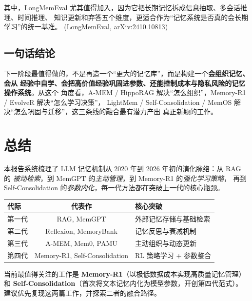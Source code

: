 \documentclass[11pt,a4paper]{article}
\begin{document}
其中，LongMemEval 尤其值得加入，因为它把长期记忆拆成信息抽取、多会话推理、时间推理、
知识更新和弃答五个维度，更适合作为“记忆系统是否真的会长期学习”的统一基准。
\hfill(\href{https://arxiv.org/abs/2410.10813}{LongMemEval, arXiv:2410.10813})

\subsection{一句话结论}

下一阶段最值得做的，不是再造一个“更大的记忆库”，而是构建一个\textbf{会组织记忆、会从
经验中自学、会把高价值经验巩固进参数、还能控制成本与隐私风险的记忆操作系统}。从这个
角度看，A-MEM / HippoRAG 解决“怎么组织”，Memory-R1 / EvolveR 解决“怎么学习决策”，
LightMem / Self-Consolidation / MemOS 解决“怎么巩固与迁移”，这三条线的融合最有潜力产出
真正新颖的工作。


\section{总结}

本报告系统梳理了 LLM 记忆机制从 2020 年到 2026 年初的演化脉络：从 RAG 的
\emph{被动检索}，到 MemGPT 的\emph{主动管理}，到 Memory-R1 的\emph{强化学习策略}，
再到 Self-Consolidation 的\emph{参数内化}，每一代方法都在突破上一代的核心瓶颈。

\begin{center}
\begin{tabular}{lcl}
\toprule
\textbf{代际} & \textbf{代表作} & \textbf{核心突破} \\
\midrule
第一代 & RAG, MemGPT & 外部记忆存储与基础检索 \\
第二代 & Reflexion, MemoryBank & 记忆反思与衰减机制 \\
第三代 & A-MEM, Mem0, PAMU & 主动组织与动态更新 \\
第四代 & Memory-R1, Self-Consolidation & RL 策略学习 + 参数整合 \\
\bottomrule
\end{tabular}
\end{center}

\vspace{1em}
当前最值得关注的工作是 \textbf{Memory-R1}（以极低数据成本实现高质量记忆管理）和
\textbf{Self-Consolidation}（首次将文本记忆内化为模型参数，开创第四代范式）。
建议优先复现这两篇工作，并探索二者的融合路径。

\newpage
\end{document}
